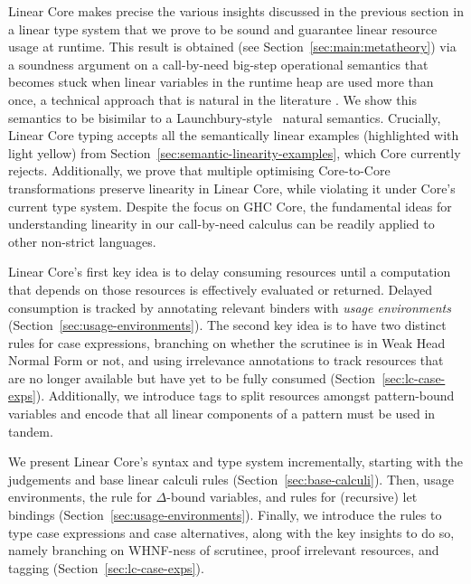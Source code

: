 \documentclass[acmsmall,review,screen]{acmart}
\newcommand{\notyetcolorname}{light yellow}
\newcommand{\ROUNDTWO}[1]{{\color{red}#1}}
\begin{document}
Linear Core makes precise the various insights discussed in the
previous section in a linear type system that we prove \ROUNDTWO{to be} sound and guarantee
linear resource usage at runtime.
This result is obtained (see Section~\ref{sec:main:metatheory}) via a soundness argument on a
call-by-need big-step operational semantics that becomes stuck when linear
variables in the runtime heap are used more than once, \ROUNDTWO{a
  technical approach that is natural in the literature \cite{}}. We show this
semantics to be bisimilar to a
Launchbury-style~\cite{10.1145/158511.158618} natural semantics. 
Crucially,
Linear Core typing accepts all the semantically linear examples
(highlighted with \colorbox{notyet}{\notyetcolorname})
from Section~\ref{sec:semantic-linearity-examples}, which Core currently
rejects.
%
Additionally, we prove that multiple optimising Core-to-Core transformations
preserve linearity in Linear Core, while violating it under Core's
current type system.
%
% 
Despite the focus on GHC Core, the fundamental ideas for
understanding linearity in our call-by-need calculus can be readily applied to
other non-strict languages.

Linear Core's first key idea is to delay consuming
resources until a computation that depends on those resources is effectively
evaluated or returned. Delayed consumption is tracked by annotating relevant
binders with \emph{usage environments} (Section~\ref{sec:usage-environments}).
%
The second key idea is to have two distinct rules for case
expressions, branching on whether the scrutinee is in Weak Head Normal
Form or not, and using  \ROUNDTWO{irrelevance annotations} to track resources that are no
longer available but have yet to be fully consumed
(Section~\ref{sec:lc-case-exps}). Additionally, we introduce tags to split
resources amongst pattern-bound variables and %
encode that all linear components of a pattern must be used in tandem.

We present Linear Core's syntax and type system incrementally, starting with the
judgements and base linear calculi rules (Section~\ref{sec:base-calculi}).
%
Then, usage environments, the rule for $\Delta$-bound variables, and rules for
(recursive) let bindings (Section~\ref{sec:usage-environments}).
%
Finally, we introduce the rules to type case expressions and case alternatives,
along with the key insights to do so, namely branching on WHNF-ness of
scrutinee, proof irrelevant resources, and tagging (Section~\ref{sec:lc-case-exps}).
\end{document}

